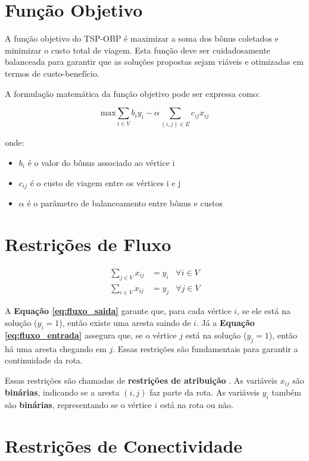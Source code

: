 \documentclass[12pt, a4paper]{report}
\begin{document}
\section{Função Objetivo}
A função objetivo do TSP-OBP é maximizar a soma dos bônus coletados e minimizar o custo total de viagem. Esta função deve ser cuidadosamente balanceada para garantir que as soluções propostas sejam viáveis e otimizadas em termos de custo-benefício.

A formulação matemática da função objetivo pode ser expressa como:

\begin{equation}
    \text{max} \sum_{i \in V} b_i y_i - \alpha \sum_{(i,j) \in E} c_{ij} x_{ij}
\end{equation}

onde:
\begin{itemize}
    \item $b_i$ é o valor do bônus associado ao vértice i
    \item $c_{ij}$ é o custo de viagem entre os vértices i e j
    \item $\alpha$ é o parâmetro de balanceamento entre bônus e custos
\end{itemize}

\section{Restrições de Fluxo}
\begin{align}
    \sum_{j \in V} x_{ij} &= y_i & \forall i \in V \label{eq:fluxo_saida} \\
    \sum_{i \in V} x_{ij} &= y_j & \forall j \in V \label{eq:fluxo_entrada}
\end{align}

A \textbf{Equação \eqref{eq:fluxo_saida}} garante que, para cada vértice $i$, se ele está na solução ($y_i=1$), então existe uma aresta saindo de $i$. Já a \textbf{Equação \eqref{eq:fluxo_entrada}} assegura que, se o vértice $j$ está na solução ($y_j=1$), então há uma aresta chegando em $j$. Essas restrições são fundamentais para garantir a continuidade da rota.

Essas restrições são chamadas de \textbf{restrições de atribuição} \cite{lopesfilho2019,carvalho2022}. As variáveis $x_{ij}$ são \textbf{binárias}, indicando se a aresta $(i,j)$ faz parte da rota. As variáveis $y_i$ também são \textbf{binárias}, representando se o vértice $i$ está na rota ou não.

\section{Restrições de Conectividade}
\end{document}
